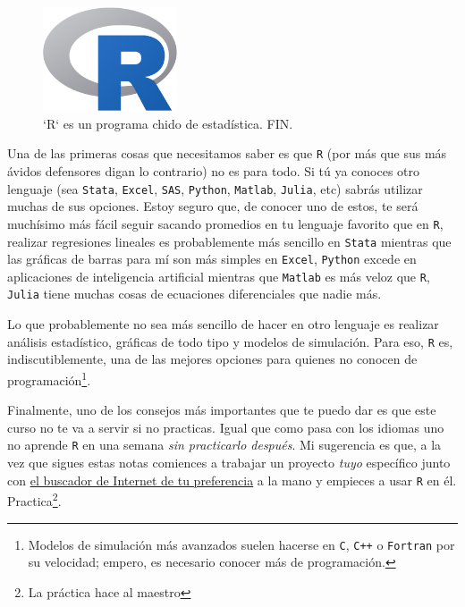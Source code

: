 \documentclass[
]{book}
\begin{document}
\begin{figure}

{\centering \includegraphics[width=150px]{images/rlogo} 

}

\caption{`R` es un programa chido de estadística. FIN.}\label{fig:unnamed-chunk-3}
\end{figure}

Una de las primeras cosas que necesitamos saber es que \texttt{R} (por más que sus más ávidos defensores digan lo contrario) no es para todo. Si tú ya conoces otro lenguaje (sea \texttt{Stata}, \texttt{Excel}, \texttt{SAS}, \texttt{Python}, \texttt{Matlab}, \texttt{Julia}, etc) sabrás utilizar muchas de sus opciones. Estoy seguro que, de conocer uno de estos, te será muchísimo más fácil seguir sacando promedios en tu lenguaje favorito que en \texttt{R}, realizar regresiones lineales es probablemente más sencillo en \texttt{Stata} mientras que las gráficas de barras para mí son más simples en \texttt{Excel}, \texttt{Python} excede en aplicaciones de inteligencia artificial mientras que \texttt{Matlab} es más veloz que \texttt{R}, \texttt{Julia} tiene muchas cosas de ecuaciones diferenciales que nadie más.

Lo que probablemente no sea más sencillo de hacer en otro lenguaje es realizar análisis estadístico, gráficas de todo tipo y modelos de simulación. Para eso, \texttt{R} es, indiscutiblemente, una de las mejores opciones para quienes no conocen de programación\footnote{Modelos de simulación más avanzados suelen hacerse en \texttt{C}, \texttt{C++} o \texttt{Fortran} por su velocidad; empero, es necesario conocer más de programación.}.

Finalmente, uno de los consejos más importantes que te puedo dar es que este curso no te va a servir si no practicas. Igual que como pasa con los idiomas uno no aprende \texttt{R} en una semana \emph{sin practicarlo después}. Mi sugerencia es que, a la vez que sigues estas notas comiences a trabajar un proyecto \emph{tuyo} específico junto con \href{https://yandex.com}{el buscador de Internet de tu preferencia} a la mano y empieces a usar \texttt{R} en él. Practica\footnote{La práctica hace al maestro}.
\end{document}
